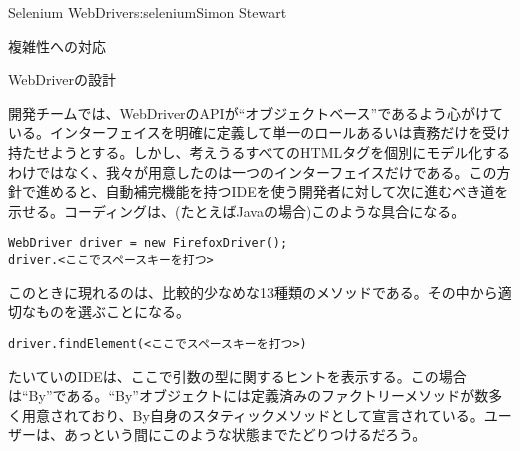 \begin{aosachapter}{Selenium WebDriver}{s:selenium}{Simon Stewart}
\begin{aosasect1}{複雑性への対応}
\begin{aosasect2}{WebDriverの設計}

開発チームでは、WebDriverのAPIが``オブジェクトベース''であるよう心がけている。インターフェイスを明確に定義して単一のロールあるいは責務だけを受け持たせようとする。しかし、考えうるすべてのHTMLタグを個別にモデル化するわけではなく、我々が用意したのは一つのインターフェイスだけである。この方針で進めると、自動補完機能を持つIDEを使う開発者に対して次に進むべき道を示せる。コーディングは、(たとえばJavaの場合)このような具合になる。

\begin{verbatim}
WebDriver driver = new FirefoxDriver();
driver.<ここでスペースキーを打つ>
\end{verbatim}

\noindent このときに現れるのは、比較的少なめな13種類のメソッドである。その中から適切なものを選ぶことになる。

\begin{verbatim}
driver.findElement(<ここでスペースキーを打つ>)
\end{verbatim}

\noindent たいていのIDEは、ここで引数の型に関するヒントを表示する。この場合は``By''である。``By''オブジェクトには定義済みのファクトリーメソッドが数多く用意されており、By自身のスタティックメソッドとして宣言されている。ユーザーは、あっという間にこのような状態までたどりつけるだろう。


\end{aosasect2}
\end{aosasect1}
\end{aosachapter}

